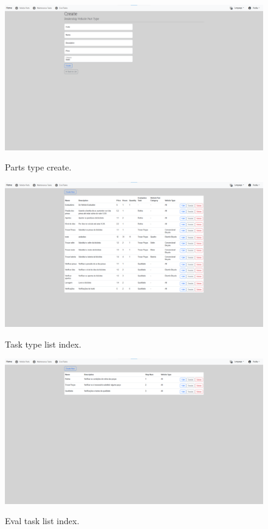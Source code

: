 \begin{figure}[htbp]
  \caption{Parts type create.}
  \centering
  \includegraphics[width=\textwidth]{figs/Implementation/dealershipAdmin/partsCreate}
  \label{fig:partsCreate}
\end{figure}



\begin{figure}[htbp]
  \caption{Task type list index.}
  \centering
  \includegraphics[width=\textwidth]{figs/Implementation/dealershipAdmin/taskIndex}
  \label{fig:taskIndex}
\end{figure}

\clearpage

\begin{figure}[htbp]
  \caption{Eval task list index.}
  \centering
  \includegraphics[width=\textwidth]{figs/Implementation/dealershipAdmin/evalIndex}
  \label{fig:evalIndex}
\end{figure}
 
